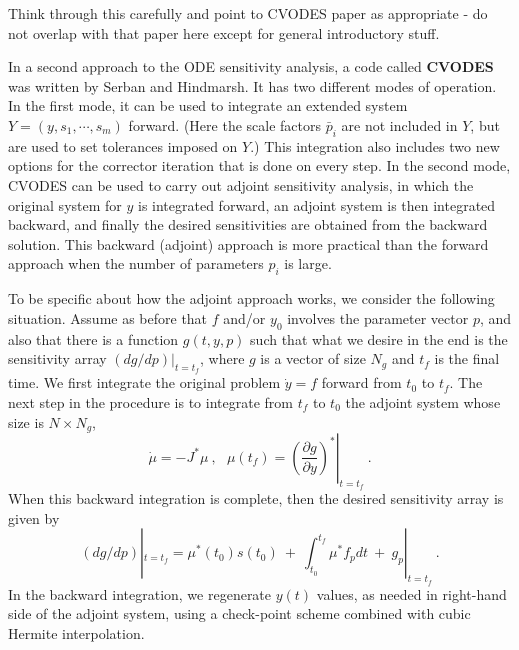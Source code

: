 
{\sf Think through this carefully and point to CVODES paper as
appropriate - do not overlap with that paper here except for
general introductory stuff.}

In a second approach to the ODE sensitivity analysis, a code called
{\bf CVODES} was written by Serban and Hindmarsh.  It has two
different modes of operation.  In the first mode, it can be used to
integrate an extended system $Y = (y,s_1,\cdots,s_m)$ forward.  (Here
the scale factors $\bar{p}_i$ are not included in $Y$, but are used to
set tolerances imposed on $Y$.)  This integration also includes two
new options for the corrector iteration that is done on every step.
In the second mode, CVODES can be used to carry out adjoint
sensitivity analysis, in which the original system for $y$ is
integrated forward, an adjoint system is then integrated backward, and
finally the desired sensitivities are obtained from the backward
solution.  This backward (adjoint) approach is more practical than
the forward approach when the number of parameters $p_i$ is large.

To be specific about how the adjoint approach works, we consider
the following situation.  Assume as before that $f$ and/or $y_0$
involves the parameter vector $p$, and also that there is a
function $g(t,y,p)$ such that what we desire in the end is the
sensitivity array $(dg/dp)|_{t=t_f}$, where $g$ is a vector of
size $N_g$ and $t_f$ is the final time.  We first integrate the
original problem $\dot{y} = f$ forward from $t_0$ to $t_f$. The
next step in the procedure is to integrate from $t_f$ to $t_0$ the
adjoint system whose size is $N \times N_g$,
\[ \dot{\mu} = -J^* \mu ~,~~~
   \mu(t_f) = \left. \left( \frac{\partial g}{\partial y}
                     \right)^* \right| _{t=t_f} ~. \]
When this backward integration is complete, then the desired
sensitivity array is given by
\[ (dg/dp)|_{t=t_f} = \mu^*(t_0)s(t_0)
   ~+~ \int_{t_0}^{t_f} \mu^* f_p dt ~+~ g_p|_{t=t_f} ~. \]
In the backward integration, we regenerate $y(t)$ values, as needed
in right-hand side of the adjoint system, using a check-point scheme
combined with cubic Hermite interpolation.


